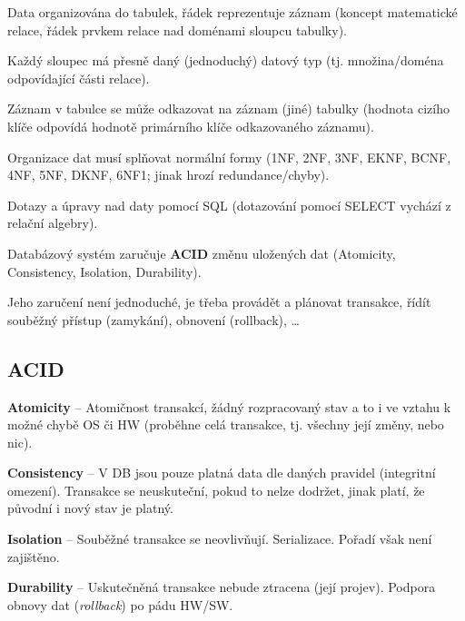 \begin{compactitem}
    \item Data organizována do tabulek, řádek reprezentuje záznam (koncept matematické relace, řádek prvkem relace nad doménami sloupcu tabulky).

    \item Každý sloupec má přesně daný (jednoduchý) datový typ (tj. množina/doména odpovídající části relace).

    \item Záznam v tabulce se může odkazovat na záznam (jiné) tabulky (hodnota cizího klíče odpovídá hodnotě primárního klíče odkazovaného záznamu).

    \item Organizace dat musí splňovat normální formy (1NF, 2NF, 3NF, EKNF, BCNF, 4NF, 5NF, DKNF, 6NF1; jinak hrozí redundance/chyby).

    \item Dotazy a úpravy nad daty pomocí SQL (dotazování pomocí SELECT vychází z relační algebry).

    \item Databázový systém zaručuje \textbf{ACID} změnu uložených dat (Atomicity, Consistency, Isolation, Durability). \begin{compactitem}
        \item Jeho zaručení není jednoduché, je třeba provádět a plánovat transakce, řídít souběžný přístup (zamykání), obnovení (rollback), \dots
    \end{compactitem}
\end{compactitem}

\subsection{ACID}

\begin{compactitem}
    \item \textbf{Atomicity} -- Atomičnost transakcí, žádný rozpracovaný stav a to i ve vztahu k možné chybě OS či HW (proběhne celá transakce, tj. všechny její změny, nebo nic).

    \item \textbf{Consistency} -- V DB jsou pouze platná data dle daných pravidel (integritní omezení). Transakce se neuskuteční, pokud to nelze dodržet, jinak platí, že původní i nový stav je platný.

    \item \textbf{Isolation} -- Souběžné transakce se neovlivňují. Serializace. Pořadí však není zajištěno.

    \item \textbf{Durability} -- Uskutečněná transakce nebude ztracena (její projev). Podpora obnovy dat (\textit{rollback}) po pádu HW/SW.
\end{compactitem}

